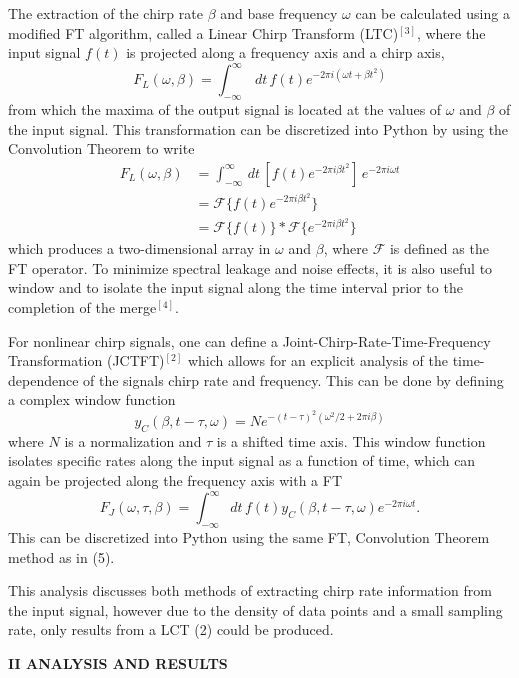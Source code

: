 \documentclass[12pt]{article}
\begin{document}
\begin{multicols}{2}
The extraction of the chirp rate $\beta$ and base frequency $\omega$ can be calculated using a modified FT algorithm, called a Linear Chirp Transform (LTC)$^{[3]}$, where the input signal $f(t)$ is projected along a frequency axis and a chirp axis, 
\[
    F_L(\omega, \beta) = \int_{-\infty}^\infty\, dt\, f(t)e^{-2\pi i (\omega t + \beta t^2)} \tag{2}  
\]
from which the maxima of the output signal is located at the values of $\omega$ and $\beta$ of the input signal. This transformation can be discretized into Python by using the Convolution Theorem to write 
\begin{align*}
    F_L(\omega, \beta) &= \int_{-\infty}^\infty\, dt\, [f(t)e^{-2\pi i\beta t^2}] \, e^{-2\pi i \omega t}\tag{3}\\
    &=\mathcal{F}\{f(t)e^{-2\pi i\beta t^2}\}\tag{4}\\
    &=\mathcal{F}\{f(t)\}\ast \mathcal{F}\{e^{-2\pi i\beta t^2}\}\tag{5}
\end{align*}
which produces a two-dimensional array in $\omega$ and $\beta$, where $\mathcal{F}$ is defined as the FT operator. To minimize spectral leakage and noise effects, it is also useful to window and to isolate the input signal along the time interval prior to the completion of the merge$^{[4]}$.  

For nonlinear chirp signals, one can define a Joint-Chirp-Rate-Time-Frequency Transformation (JCTFT)$^{[2]}$ which allows for an explicit analysis of the time-dependence of the signals chirp rate and frequency. This can be done by defining a complex window function 
\[
    y_C(\beta, t - \tau, \omega) = N e^{-(t - \tau)^2(\omega^2/2 + 2\pi i \beta)} \tag{6}   
\]
\nd where $N$ is a normalization and $\tau$ is a shifted time axis. This window function isolates specific rates along the input signal as a function of time, which can again be projected along the frequency axis with a FT
\[
    F_{J}(\omega, \tau, \beta) = \int_{-\infty}^\infty dt\, f(t)y_C(\beta, t - \tau, \omega) e^{-2\pi i \omega t}.\tag{7} 
\]
This can be discretized into Python using the same FT, Convolution Theorem method as in (5). 

This analysis discusses both methods of extracting chirp rate information from the input signal, however due to the density of data points and a small sampling rate, only results from a LCT (2) could be produced. 




\vspace{10pt}

\begin{center}
    \textbf{II \hspace{5pt} ANALYSIS AND RESULTS}


\end{center}
\end{multicols}
\end{document}

